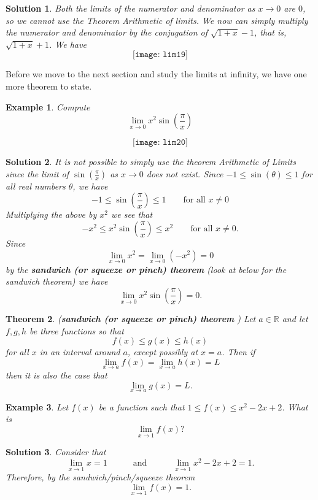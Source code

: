 \documentclass[12pt,a4paper]{book}
\newtheorem{theorem}{Theorem}[section]
\newtheorem{Example}[theorem]{Example}
\numberwithin{equation}{section}
\newtheorem*{solution}{{\bf Solution}}
\begin{document}
\begin{solution}
	Both the limits of the numerator and denominator as $x \to 0$ are $0$, so we cannot use  the Theorem  Arithmetic of limits. We now can simply multiply the numerator and denominator by the conjugation of $\sqrt{1+x}-1$, that is, $\sqrt{1+x}+1$. We have
		$$
	\texttt{[image: lim19]}
	$$
	
\end{solution}
Before we move to the next section and study the limits at infinity, we have one more theorem to state. 
\begin{Example}
	Compute 
	$$\lim_{x\to 0} x^2\sin(\frac{\pi}{x})$$
\end{Example}
	$$
\texttt{[image: lim20]}
$$

\begin{solution}
	It is not possible to simply use the theorem Arithmetic of Limits since the limit of $\sin(\frac{\pi}{x})$ as $x\to 0$ does not exist.  Since $-1\leq \sin (\theta)\leq 1$ for all real numbers $\theta$, we have 
	$$-1\leq \sin(\frac{\pi}{x})\leq 1 \quad \quad \text{for all~}x\neq 0$$
	Multiplying the above by $x^2$ we see that 
	$$-x^2\leq x^2\sin(\frac{\pi}{x})\leq x^2 \quad \quad \text{for all~}x\neq 0.$$
	Since  $$\lim_{x\to 0}x^2=\lim_{x\to 0}(-x^2)=0$$ by the {\bf sandwich (or squeeze or pinch) theorem} (look at below for the sandwich theorem) we have 
	$$\lim_{x\to 0} x^2\sin(\frac{\pi}{x})=0.$$
\end{solution}

\begin{theorem}({\bf sandwich (or squeeze or pinch) theorem} )
	Let $a\in \mathbb{R}$ and let $f,g,h$ be three functions so that 
	$$f(x) \leq g(x) \leq h(x)$$
	for all $x$ in an interval around $a$, except possibly at $x=a$. Then if 
	$$\lim_{x\to a}f(x)=\lim_{x\to a}h(x)=L$$
	then it is also the case that 
	$$\lim_{x\to a}g(x)=L.$$
\end{theorem}

\begin{Example}
	Let $f(x)$ be a function such that $1\leq f(x)\leq x^2-2x+2$. What is 
	$$\lim_{x\to 1}f(x)?$$
\end{Example}

\begin{solution}
	Consider that 
	$$\lim_{x\to 1}x=1\quad \quad \quad \text{and}\quad \quad \quad \lim_{x\to 1}x^2-2x+2=1.$$
	Therefore, by the sandwich/pinch/squeeze theorem 
	$$\lim_{x\to 1}f(x)=1.$$
\end{solution}
\end{document}

